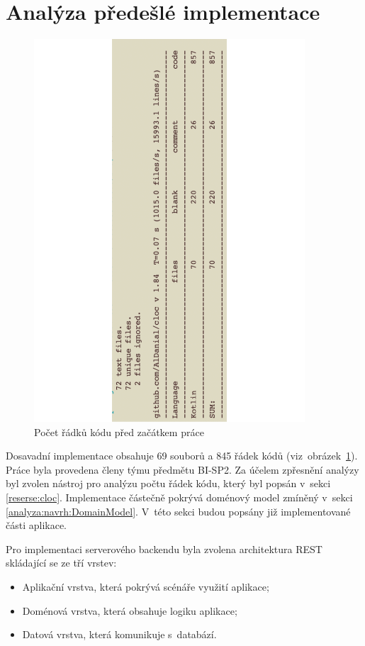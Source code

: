 \section{Analýza předešlé implementace}\label{analyza:soucasnaImplementace}
    \begin{figure}\centering
	   \includegraphics[angle=-90, width=0.9\textwidth]{pdfs/Cloc1}
	   \caption[Počet řádků kódu před začátkem práce]{Počet řádků kódu před začátkem práce}\label{image:cloc1}
    \end{figure}
    Dosavadní implementace obsahuje 69 souborů a 845 řádek kódů (viz~obrázek~\ref{image:cloc1}). Práce byla provedena členy týmu předmětu BI-SP2. Za účelem zpřesnění analýzy byl zvolen nástroj pro analýzu počtu řádek kódu, který byl popsán v~sekci \ref{reserse:cloc}. Implementace částečně pokrývá doménový model zmíněný v~sekci \ref{analyza:navrh:DomainModel}. V~této sekci budou popsány již implementované části aplikace. 
     
    Pro implementaci serverového backendu byla zvolena architektura REST skládající se ze tří vrstev:
    \begin{itemize}
         \setlength\itemsep{0.3em}
         \item Aplikační vrstva, která pokrývá scénáře využití aplikace;
         \item Doménová vrstva, která obsahuje logiku aplikace;
         \item Datová vrstva, která komunikuje s~databází.
    \end{itemize}
    
